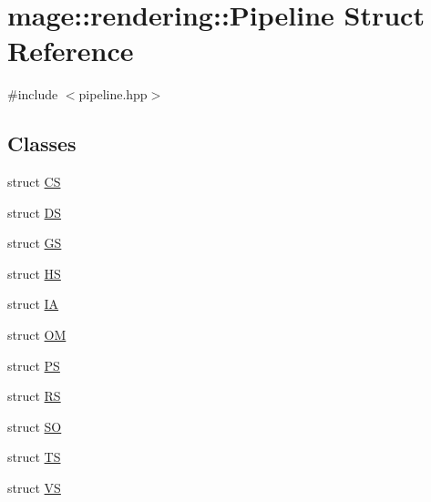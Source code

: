 \hypertarget{structmage_1_1rendering_1_1_pipeline}{}\section{mage\+:\+:rendering\+:\+:Pipeline Struct Reference}
\label{structmage_1_1rendering_1_1_pipeline}


{\ttfamily \#include $<$pipeline.\+hpp$>$}

\subsection*{Classes}
\begin{DoxyCompactItemize}
\item 
struct \mbox{\hyperlink{structmage_1_1rendering_1_1_pipeline_1_1_c_s}{CS}}
\item 
struct \mbox{\hyperlink{structmage_1_1rendering_1_1_pipeline_1_1_d_s}{DS}}
\item 
struct \mbox{\hyperlink{structmage_1_1rendering_1_1_pipeline_1_1_g_s}{GS}}
\item 
struct \mbox{\hyperlink{structmage_1_1rendering_1_1_pipeline_1_1_h_s}{HS}}
\item 
struct \mbox{\hyperlink{structmage_1_1rendering_1_1_pipeline_1_1_i_a}{IA}}
\item 
struct \mbox{\hyperlink{structmage_1_1rendering_1_1_pipeline_1_1_o_m}{OM}}
\item 
struct \mbox{\hyperlink{structmage_1_1rendering_1_1_pipeline_1_1_p_s}{PS}}
\item 
struct \mbox{\hyperlink{structmage_1_1rendering_1_1_pipeline_1_1_r_s}{RS}}
\item 
struct \mbox{\hyperlink{structmage_1_1rendering_1_1_pipeline_1_1_s_o}{SO}}
\item 
struct \mbox{\hyperlink{structmage_1_1rendering_1_1_pipeline_1_1_t_s}{TS}}
\item 
struct \mbox{\hyperlink{structmage_1_1rendering_1_1_pipeline_1_1_v_s}{VS}}
\end{DoxyCompactItemize}
